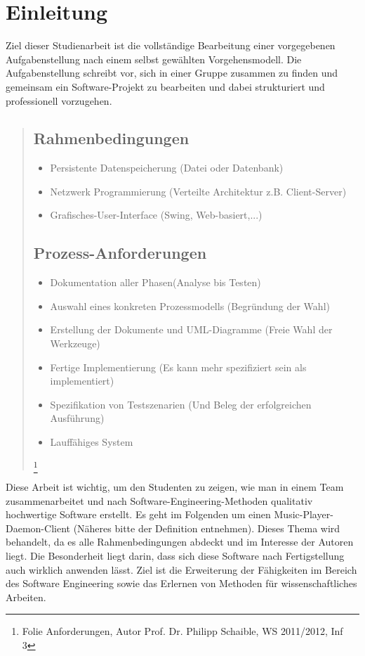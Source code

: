\chapter{Einleitung}
Ziel dieser Studienarbeit ist die vollständige Bearbeitung einer vorgegebenen Aufgabenstellung nach einem selbst gewählten Vorgehensmodell. Die Aufgabenstellung schreibt vor, sich in einer Gruppe zusammen zu finden und gemeinsam ein Software-Projekt zu bearbeiten und dabei strukturiert und professionell vorzugehen.\\

\begin{quote}
\section{Rahmenbedingungen}

\renewcommand{\labelitemi}{•}
\begin{itemize}
	\item Persistente Datenspeicherung (Datei oder Datenbank)
	\item Netzwerk Programmierung (Verteilte Architektur z.B. Client-Server)
	\item Grafisches-User-Interface (Swing, Web-basiert,...)
\end{itemize}

\section{Prozess-Anforderungen}

\begin{itemize}
	\item Dokumentation aller Phasen(Analyse bis Testen)
	\item Auswahl eines konkreten Prozessmodells (Begründung der Wahl)
	\item Erstellung der Dokumente und UML-Diagramme (Freie Wahl der Werkzeuge)
	\item Fertige Implementierung (Es kann mehr spezifiziert sein als implementiert)
	\item Spezifikation von Testszenarien (Und Beleg der erfolgreichen Ausführung)
	\item Lauffähiges System 
\end{itemize}

\footnote{Folie Anforderungen, Autor Prof. Dr. Philipp Schaible, WS 2011/2012, Inf 3}
\end{quote}

Diese Arbeit ist wichtig, um den Studenten zu zeigen, wie man in einem Team zusammenarbeitet und nach Software-Engineering-Methoden qualitativ hochwertige Software erstellt.
Es geht im Folgenden um einen Music-Player-Daemon-Client (Näheres bitte der Definition entnehmen). Dieses Thema wird behandelt, da es alle Rahmenbedingungen abdeckt und im Interesse der Autoren liegt. Die Besonderheit liegt darin, dass sich diese Software nach Fertigstellung auch wirklich anwenden lässt. Ziel ist die Erweiterung der Fähigkeiten im Bereich des Software Engineering sowie das Erlernen von Methoden für wissenschaftliches Arbeiten.
